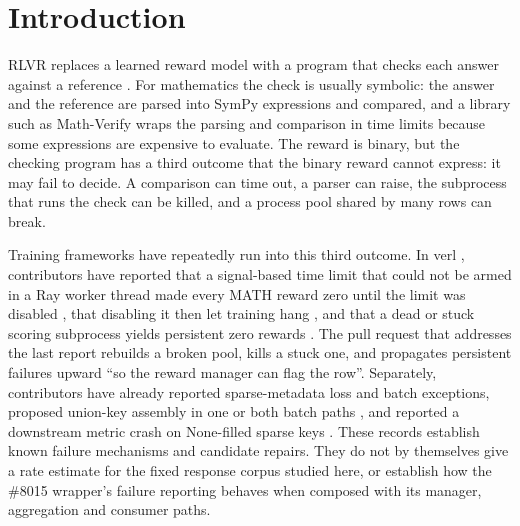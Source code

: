 \documentclass[11pt,a4paper]{article}
\newcommand{\pr}[1]{\#{#1}}
\begin{document}
\section{Introduction}
RLVR replaces a learned reward model with a program that checks each answer against a reference \cite{deepseekr1,tulu3,deepseekmath}. For mathematics the check is usually symbolic: the answer and the reference are parsed into SymPy expressions and compared, and a library such as Math-Verify \cite{mathverify} wraps the parsing and comparison in time limits because some expressions are expensive to evaluate. The reward is binary, but the checking program has a third outcome that the binary reward cannot express: it may fail to decide. A comparison can time out, a parser can raise, the subprocess that runs the check can be killed, and a process pool shared by many rows can break.

Training frameworks have repeatedly run into this third outcome. In verl \cite{hybridflow}, contributors have reported that a signal-based time limit that could not be armed in a Ray worker thread made every MATH reward zero until the limit was disabled \cite{verl5635}, that disabling it then let training hang \cite{verl5839}, and that a dead or stuck scoring subprocess yields persistent zero rewards \cite{verl8011}. The pull request that addresses the last report \cite{verl8015} rebuilds a broken pool, kills a stuck one, and propagates persistent failures upward ``so the reward manager can flag the row''. Separately, contributors have already reported sparse-metadata loss and batch exceptions, proposed union-key assembly in one or both batch paths \cite{verl6545,verl7151}, and reported a downstream metric crash on None-filled sparse keys \cite{verl6830,verl6845}. These records establish known failure mechanisms and candidate repairs. They do not by themselves give a rate estimate for the fixed response corpus studied here, or establish how the \pr{8015} wrapper's failure reporting behaves when composed with its manager, aggregation and consumer paths.
\end{document}
